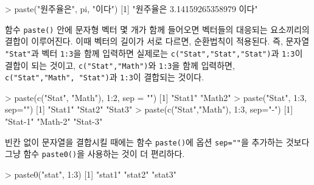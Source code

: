\documentclass[
]{book}
\newenvironment{Shaded}{\begin{snugshade}}{\end{snugshade}}
\newcommand{\AttributeTok}[1]{\textcolor[rgb]{0.77,0.63,0.00}{#1}}
\newcommand{\DecValTok}[1]{\textcolor[rgb]{0.00,0.00,0.81}{#1}}
\newcommand{\FunctionTok}[1]{\textcolor[rgb]{0.00,0.00,0.00}{#1}}
\newcommand{\NormalTok}[1]{#1}
\newcommand{\SpecialCharTok}[1]{\textcolor[rgb]{0.00,0.00,0.00}{#1}}
\newcommand{\StringTok}[1]{\textcolor[rgb]{0.31,0.60,0.02}{#1}}
\begin{document}
\begin{Shaded}
\begin{Highlighting}[]
\SpecialCharTok{\textgreater{}} \FunctionTok{paste}\NormalTok{(}\StringTok{"원주율은"}\NormalTok{, pi, }\StringTok{"이다"}\NormalTok{)}
\NormalTok{[}\DecValTok{1}\NormalTok{] }\StringTok{"원주율은 3.14159265358979 이다"}
\end{Highlighting}
\end{Shaded}

함수 \texttt{paste()} 안에 문자형 벡터 몇 개가 함께 들어오면 벡터들의 대응되는 요소끼리의
결합이 이루어진다. 이때 벡터의 길이가 서로 다르면, 순환법칙이 적용된다. 즉, 문자열
\texttt{"Stat"}과 벡터 \texttt{1:3}을 함께 입력하면 실제로는 \texttt{c("Stat","Stat","Stat")}과 \texttt{1:3}이 결합이 되는 것이고, \texttt{c("Stat","Math")}와 \texttt{1:3}을 함께 입력하면, \texttt{c("Stat","Math",\ "Stat")}과 \texttt{1:3}이 결합되는 것이다.

\begin{Shaded}
\begin{Highlighting}[]
\SpecialCharTok{\textgreater{}} \FunctionTok{paste}\NormalTok{(}\FunctionTok{c}\NormalTok{(}\StringTok{"Stat"}\NormalTok{, }\StringTok{"Math"}\NormalTok{), }\DecValTok{1}\SpecialCharTok{:}\DecValTok{2}\NormalTok{, }\AttributeTok{sep =} \StringTok{""}\NormalTok{)}
\NormalTok{[}\DecValTok{1}\NormalTok{] }\StringTok{"Stat1"} \StringTok{"Math2"}
\SpecialCharTok{\textgreater{}} \FunctionTok{paste}\NormalTok{(}\StringTok{"Stat"}\NormalTok{, }\DecValTok{1}\SpecialCharTok{:}\DecValTok{3}\NormalTok{, }\AttributeTok{sep=}\StringTok{""}\NormalTok{)}
\NormalTok{[}\DecValTok{1}\NormalTok{] }\StringTok{"Stat1"} \StringTok{"Stat2"} \StringTok{"Stat3"}
\SpecialCharTok{\textgreater{}} \FunctionTok{paste}\NormalTok{(}\FunctionTok{c}\NormalTok{(}\StringTok{"Stat"}\NormalTok{,}\StringTok{"Math"}\NormalTok{), }\DecValTok{1}\SpecialCharTok{:}\DecValTok{3}\NormalTok{, }\AttributeTok{sep=}\StringTok{"{-}"}\NormalTok{)}
\NormalTok{[}\DecValTok{1}\NormalTok{] }\StringTok{"Stat{-}1"} \StringTok{"Math{-}2"} \StringTok{"Stat{-}3"}
\end{Highlighting}
\end{Shaded}

빈칸 없이 문자열을 결합시킬 때에는 함수 \texttt{paste()}에 옵션 \texttt{sep=""}을 추가하는 것보다
그냥 함수 \texttt{paste0()}을 사용하는 것이 더 편리하다.

\begin{Shaded}
\begin{Highlighting}[]
\SpecialCharTok{\textgreater{}} \FunctionTok{paste0}\NormalTok{(}\StringTok{"stat"}\NormalTok{, }\DecValTok{1}\SpecialCharTok{:}\DecValTok{3}\NormalTok{)}
\NormalTok{[}\DecValTok{1}\NormalTok{] }\StringTok{"stat1"} \StringTok{"stat2"} \StringTok{"stat3"}
\end{Highlighting}
\end{Shaded}
\end{document}
